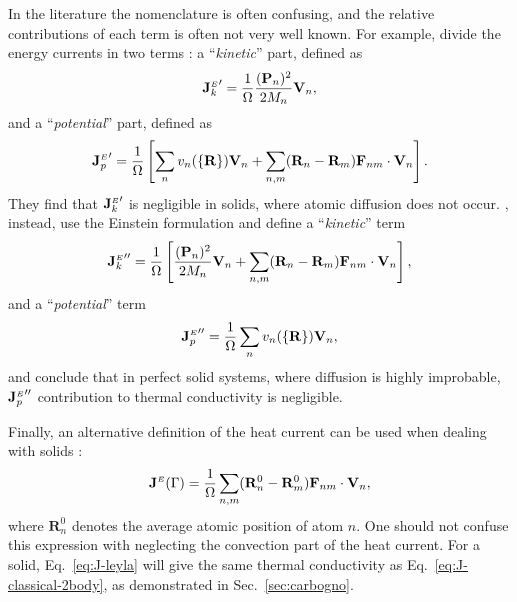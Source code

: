 \begin{LEtext}
In the literature the nomenclature is often confusing, and the relative contributions of each term is often not very well known. 
For example, \citet{Vogelsang1987} divide the energy currents in two terms \cite{McQuarrie2000}: a ``\emph{kinetic}'' part, defined as
\begin{equation}
    {\mathbf{J}^{\scriptscriptstyle E}_k}' = \frac{1}{{\mathrm\Omega}} \frac{(\mathbf{P}_n)^2}{2M_n} \mathbf{V}_n ,
\end{equation}
and a ``\emph{potential}'' part, defined as
\begin{equation}
    {\mathbf{J}^{\scriptscriptstyle E}_p}' = \frac{1}{{\mathrm\Omega}} \left[ \sum_n  v_n(\{\mathbf{R}\}) \mathbf{V}_n + \sum_{n,m} (\mathbf{R}_n-\mathbf{R}_m) \mathbf{F}_{n m} \cdot \mathbf{V}_n \right] .
\end{equation}
They find that ${\mathbf{J}^{\scriptscriptstyle E}_k}'$ is negligible in solids, where atomic diffusion does not occur.
\citet{Kinaci2012}, instead, use the Einstein formulation and define a ``\emph{kinetic}'' term
\begin{equation}
    {\mathbf{J}^{\scriptscriptstyle E}_k}'' = \frac{1}{{\mathrm\Omega}} \left[ \frac{(\mathbf{P}_n)^2}{2M_n} \mathbf{V}_n + \sum_{n,m} (\mathbf{R}_n-\mathbf{R}_m) \mathbf{F}_{n m} \cdot \mathbf{V}_n \right],
\end{equation}
and a ``\emph{potential}'' term
\begin{equation}
    {\mathbf{J}^{\scriptscriptstyle E}_p}'' = \frac{1}{{\mathrm\Omega}} \sum_n  v_n(\{\mathbf{R}\}) \mathbf{V}_n ,
\end{equation}
and conclude that in perfect solid systems, where diffusion is highly improbable, ${\mathbf{J}^{\scriptscriptstyle E}_p}''$ contribution to thermal conductivity is negligible.

Finally, an alternative definition of the heat current can be used when dealing with solids \cite{Ladd1986}:
\begin{equation}
    \mathbf{J}^\smallE(\rGamma) =
       \frac{1}{\rOmega} \sum_{n,m} (\mathbf{R}_n^0 -\mathbf{R}_m^0) \mathbf{F}_{n m} \cdot \mathbf{V}_n , \label{eq:J-leyla}
\end{equation}
where $\mathbf{R}_n^0$ denotes the average atomic position of atom $n$. One should not confuse this expression with neglecting the convection part of the heat current. For a solid, Eq.~\eqref{eq:J-leyla} will give the same thermal conductivity as Eq.~\eqref{eq:J-classical-2body}, as demonstrated in Sec.~\ref{sec:carbogno}.



\end{LEtext}
